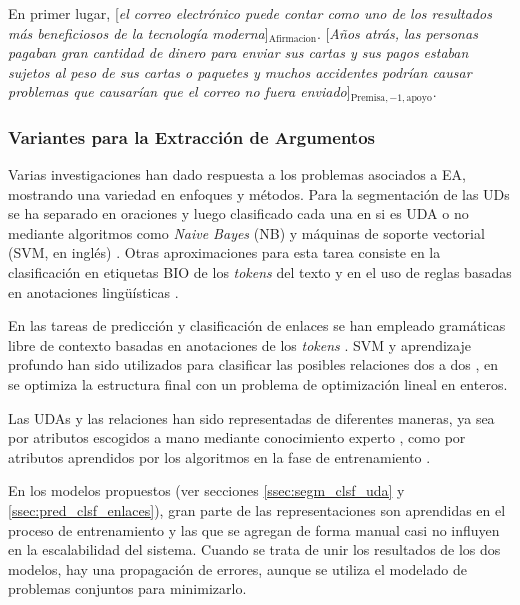 \documentclass{rcci} %
\begin{document}
\begin{adjustwidth}{25pt}{25pt}
    En primer lugar, [\emph{el correo electr\'onico puede contar como uno de los resultados
    m\'as beneficiosos de la tecnolog\'ia moderna}]$_{\mathrm{Afirmacion}}$. [\emph{A\~nos atr\'as, las personas pagaban gran cantidad de dinero para 
    enviar sus cartas y sus pagos estaban sujetos al peso de sus cartas o paquetes y muchos accidentes podr\'ian 
    causar problemas que causar\'ian que el correo no fuera enviado}]$_{\mathrm{Premisa, -1, apoyo}}$.
\end{adjustwidth}

\subsubsection*{Variantes para la Extracci\'on de Argumentos}

Varias investigaciones han dado respuesta a los problemas asociados a EA, mostrando
una variedad en enfoques y m\'etodos. Para la segmentaci\'on de las UDs se ha separado
en oraciones y luego clasificado cada una en si es UDA o no mediante algoritmos como 
\textit{Naive Bayes} (NB) y m\'aquinas de soporte vectorial (SVM, en ingl\'es) \citep{palau2009argumentation,goudas2015argument}.
Otras aproximaciones para esta tarea consiste en la clasificaci\'on en etiquetas BIO
de los \textit{tokens} del texto \citep{goudas2015argument,stab2017parsing,eger2017neural} y en el uso de
reglas basadas en anotaciones ling\"u\'isticas \citep{dykes2020reconstructing}.

En las tareas de predicci\'on y clasificaci\'on de enlaces se han empleado gram\'aticas libre de contexto 
basadas en anotaciones de los \textit{tokens} \citep{palau2009argumentation}. SVM y aprendizaje profundo han sido utilizados para clasificar 
las posibles relaciones dos a dos \citep{goudas2015argument,galassi2021deep}, en \citep{goudas2015argument}
se optimiza la estructura final con un problema de optimizaci\'on lineal en enteros.

Las UDAs y las relaciones han sido representadas de diferentes maneras, ya sea por 
atributos escogidos a mano mediante conocimiento experto \citep{palau2009argumentation,goudas2015argument}, como
por atributos aprendidos por los algoritmos en la fase de entrenamiento \citep{eger2017neural,galassi2021deep}.

En los modelos propuestos (ver secciones \ref{ssec:segm_clsf_uda} y \ref{ssec:pred_clsf_enlaces}), gran parte de las representaciones son aprendidas en el proceso de 
entrenamiento y las que se agregan de forma manual casi no influyen en la escalabilidad del sistema.
Cuando se trata de unir los resultados de los dos modelos, hay una propagaci\'on de errores, 
aunque se utiliza el modelado de problemas conjuntos para minimizarlo.
\end{document}
